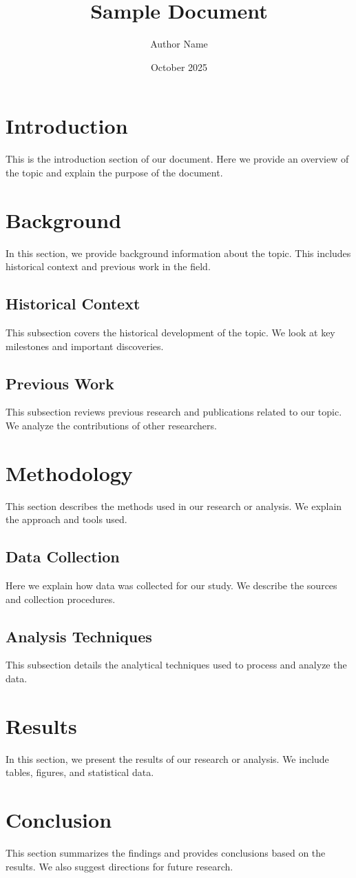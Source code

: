 \documentclass{article}
\title{Sample Document}
\author{Author Name}
\date{October 2025}
\begin{document}
\maketitle

\section{Introduction}
This is the introduction section of our document. Here we provide an overview of the topic and explain the purpose of the document.

\section{Background}
In this section, we provide background information about the topic. This includes historical context and previous work in the field.

\subsection{Historical Context}
This subsection covers the historical development of the topic. We look at key milestones and important discoveries.

\subsection{Previous Work}
This subsection reviews previous research and publications related to our topic. We analyze the contributions of other researchers.

\section{Methodology}
This section describes the methods used in our research or analysis. We explain the approach and tools used.

\subsection{Data Collection}
Here we explain how data was collected for our study. We describe the sources and collection procedures.

\subsection{Analysis Techniques}
This subsection details the analytical techniques used to process and analyze the data.

\section{Results}
In this section, we present the results of our research or analysis. We include tables, figures, and statistical data.

\section{Conclusion}
This section summarizes the findings and provides conclusions based on the results. We also suggest directions for future research.
\end{document}
